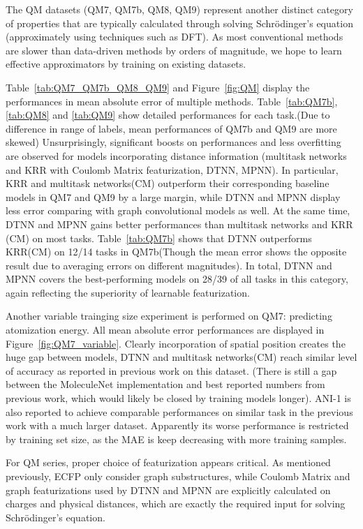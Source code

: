 The QM datasets (QM7, QM7b, QM8, QM9) represent another distinct category of properties that are typically calculated through solving Schr\"odinger's equation (approximately using techniques such as DFT). As most conventional methods are slower than data-driven methods by orders of magnitude, we hope to learn effective approximators by training on existing datasets.

Table~\ref{tab:QM7_QM7b_QM8_QM9} and Figure~\ref{fig:QM} display the performances in mean absolute error of multiple methods. Table~\ref{tab:QM7b}, \ref{tab:QM8} and \ref{tab:QM9} show detailed performances for each task.(Due to difference in range of labels, mean performances of QM7b and QM9 are more skewed) Unsurprisingly, significant boosts on performances and less overfitting are observed for models incorporating distance information (multitask networks and KRR with Coulomb Matrix featurization, DTNN, MPNN). In particular, KRR and multitask networks(CM) outperform their corresponding baseline models in QM7 and QM9 by a large margin, while DTNN and MPNN display less error comparing with graph convolutional models as well. At the same time, DTNN and MPNN gains better performances than multitask networks and KRR (CM) on most tasks. Table~\ref{tab:QM7b} shows that DTNN outperforms KRR(CM) on 12/14 tasks in QM7b(Though the mean error shows the opposite result due to averaging errors on different magnitudes). In total, DTNN and MPNN covers the best-performing models on 28/39 of all tasks in this category, again reflecting the superiority of learnable featurization.

Another variable trainging size experiment is performed on QM7: predicting atomization energy. All mean absolute error performances are displayed in Figure~\ref{fig:QM7_variable}. Clearly incorporation of spatial position creates the huge gap between models, DTNN and multitask networks(CM) reach similar level of accuracy as reported in previous work on this dataset. (There is still a gap between the MoleculeNet implementation and best reported numbers from previous work\cite{GDB7_dataset_arxiv, schutt2016quantum}, which would likely be closed by training models longer). ANI-1 is also reported to achieve comparable performances on similar task in the previous work\cite{ANI-1} with a much larger dataset. Apparently its worse performance is restricted by training set size, as the MAE is keep decreasing with more training samples.

For QM series, proper choice of featurization appears critical. As mentioned previously, ECFP only consider graph substructures, while Coulomb Matrix and graph featurizations used by DTNN and MPNN are explicitly calculated on charges and physical distances, which are exactly the required input for  solving Schr\"odinger's equation. 



